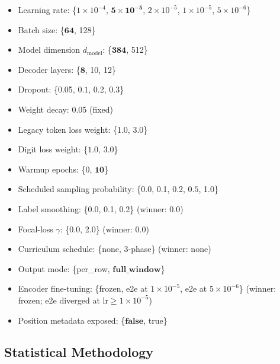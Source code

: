 \begin{itemize}
\item Learning rate: \{$1\!\times\!10^{-4}$, $\mathbf{5\!\times\!10^{-5}}$, $2\!\times\!10^{-5}$, $1\!\times\!10^{-5}$, $5\!\times\!10^{-6}$\}
\item Batch size: \{$\mathbf{64}$, 128\}
\item Model dimension $d_{\text{model}}$: \{$\mathbf{384}$, 512\}
\item Decoder layers: \{$\mathbf{8}$, 10, 12\}
\item Dropout: \{0.05, $\mathbf{0.1}$, 0.2, 0.3\}
\item Weight decay: 0.05 (fixed)
\item Legacy token loss weight: \{1.0, $\mathbf{3.0}$\}
\item Digit loss weight: \{$\mathbf{1.0}$, 3.0\}
\item Warmup epochs: \{0, $\mathbf{10}$\}
\item Scheduled sampling probability: \{0.0, 0.1, 0.2, $\mathbf{0.5}$, 1.0\}
\item Label smoothing: \{0.0, 0.1, 0.2\} (winner: 0.0)
\item Focal-loss $\gamma$: \{0.0, 2.0\} (winner: 0.0)
\item Curriculum schedule: \{none, 3-phase\} (winner: none)
\item Output mode: \{per\_row, $\mathbf{full\_window}$\}
\item Encoder fine-tuning: \{frozen, e2e at $1\!\times\!10^{-5}$, e2e at $5\!\times\!10^{-6}$\} (winner: frozen; e2e diverged at lr$\ge\!1\!\times\!10^{-5}$)
\item Position metadata exposed: \{$\mathbf{false}$, true\}
\end{itemize}

\subsection{Statistical Methodology}
\label{app:repl-stats}

